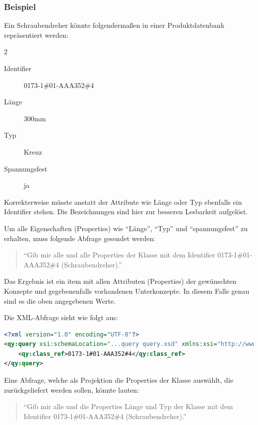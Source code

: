 \subsubsection{Beispiel}\label{lab:schraubendreher}

Ein Schraubendreher könnte folgendermaßen in einer Produktdatenbank repräsentiert werden:
\begin{multicols}{2}
\begin{description}
\item[Identifier] 0173-1\#01-AAA352\#4 
\item[Länge] 300mm
\item[Typ] Kreuz
\item[Spannungsfest] ja
\end{description}
\end{multicols}

Korrekterweise müsste anstatt der Attribute wie Länge oder Typ ebenfalls ein Identifier stehen. Die Bezeichnungen sind hier zur besseren Lesbarkeit aufgelöst. 

Um alle Eigenschaften (Properties) wie \enquote{Länge}, \enquote{Typ} und \enquote{spannungsfest} zu erhalten, muss folgende Abfrage gesendet werden: 
\begin{quotation}
\enquote{Gib mir alle  und alle Properties der Klasse mit dem Identifier 0173-1\#01-AAA352\#4 (Schraubendreher).}
\end{quotation}

Das Ergebnis ist ein \gls{item} mit allen Attributen (Properties) der gewünschten Konzepte und gegebenenfalls vorhandenen Unterkonzepte. In diesem Falle genau sind es die oben angegebenen Werte.

Die XML-Abfrage sieht wie folgt aus:

\begin{lstlisting}[caption=Query Beispiel - alle Daten abfragen, language=XML, label=UseCaseDatenabfragen]
<?xml version="1.0" encoding="UTF-8"?>
<qy:query xsi:schemaLocation="...query query.xsd" xmlns:xsi="http://www.w3.org/2001/XMLSchema-instance" xmlns:cat="...catalogue" xmlns:val="...value" xmlns:qy="...query" xmlns:bas="...basic">
	<qy:class_ref>0173-1#01-AAA352#4</qy:class_ref>
</qy:query>
\end{lstlisting}

Eine Abfrage, welche als Projektion die Properties der Klasse auswählt, die zurückgeliefert werden sollen, könnte lauten: 
\begin{quotation}
\enquote{Gib mir alle  und die Properties Länge und Typ der Klasse mit dem Identifier 0173-1\#01-AAA352\#4 (Schraubendreher).}
\end{quotation}

